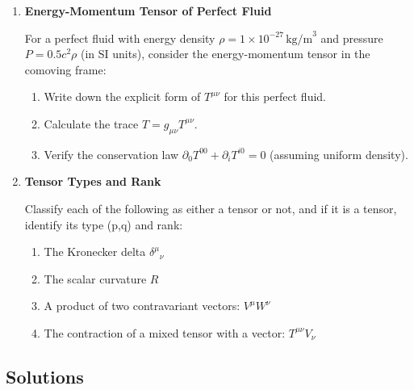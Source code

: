 \begin{enumerate}[label=1.\arabic*]
  Given the Minkowski metric $g_{\mu\nu} = \operatorname{diag}(-1, 1, 1, 1)$ and a contravariant vector $A^\mu = (2, 1, -1, 3)$:
  \begin{enumerate}[label=(\alph*)]
    \item Lower the indices to find $A_\mu = g_{\mu\nu} A^\nu$.
    \item Calculate the scalar product $A_\mu A^\mu$.
    \item If another vector is $B^\mu = (1, 0, 1, 0)$, compute the dot product $A \cdot B = g_{\mu\nu} A^\mu B^\nu$.
  \end{enumerate}
  
  \item \label{q:1.4} \textbf{Energy-Momentum Tensor of Perfect Fluid}
  
  For a perfect fluid with energy density $\rho = 1 \times 10^{-27} \, \text{kg/m}^3$ and pressure $P = 0.5 c^2 \rho$ (in SI units), consider the energy-momentum tensor in the comoving frame:
  \begin{enumerate}[label=(\alph*)]
    \item Write down the explicit form of $T^{\mu\nu}$ for this perfect fluid.
    \item Calculate the trace $T = g_{\mu\nu} T^{\mu\nu}$.
    \item Verify the conservation law $\partial_0 T^{00} + \partial_i T^{i0} = 0$ (assuming uniform density).
  \end{enumerate}
  
  \item \label{q:1.5} \textbf{Tensor Types and Rank}
  
  Classify each of the following as either a tensor or not, and if it is a tensor, identify its type (p,q) and rank:
  \begin{enumerate}[label=(\alph*)]
    \item The Kronecker delta $\delta^\mu{}_\nu$
    \item The scalar curvature $R$
    \item A product of two contravariant vectors: $V^\mu W^\nu$
    \item The contraction of a mixed tensor with a vector: $T^{\mu\nu} V_\nu$
  \end{enumerate}

\end{enumerate}

\bigskip
\bigskip
\bigskip

\subsection{Solutions}

